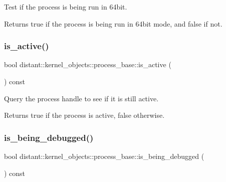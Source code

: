 Test if the process is being run in 64bit. 

\begin{DoxyReturn}{Returns}
true if the process is being run in 64bit mode, and false if not. 
\end{DoxyReturn}
\mbox{\label{classdistant_1_1kernel__objects_1_1process__base_ac3d56fd3e4c92b1e1dbbf2f5f9242fbe}} 
\subsubsection{\texorpdfstring{is\+\_\+active()}{is\_active()}}
{\footnotesize\ttfamily bool distant\+::kernel\+\_\+objects\+::process\+\_\+base\+::is\+\_\+active (\begin{DoxyParamCaption}{ }\end{DoxyParamCaption}) const\hspace{0.3cm}{\ttfamily [inline]}}



Query the process handle to see if it is still active. 

\begin{DoxyReturn}{Returns}
true if the process is active, false otherwise. 
\end{DoxyReturn}
\mbox{\label{classdistant_1_1kernel__objects_1_1process__base_a9acb308895639407b1925ad238f05344}} 
\subsubsection{\texorpdfstring{is\+\_\+being\+\_\+debugged()}{is\_being\_debugged()}}
{\footnotesize\ttfamily bool distant\+::kernel\+\_\+objects\+::process\+\_\+base\+::is\+\_\+being\+\_\+debugged (\begin{DoxyParamCaption}{ }\end{DoxyParamCaption}) const\hspace{0.3cm}{\ttfamily [inline]}}



